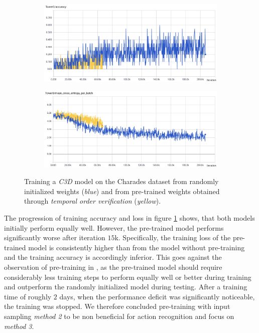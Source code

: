 \begin{figure}[H]
    \begin{subfigure}[c]{\textwidth}
    \centering
    \includegraphics[width=\textwidth]{img_evaluation/pretrain2_initialized/tower0accuracy}
    \end{subfigure}
    \begin{subfigure}[c]{\textwidth}
    \includegraphics[width=\textwidth]{img_evaluation/pretrain2_initialized/tower0crossentropy}
    \end{subfigure}
    \caption{Training a \textit{C3D} model on the Charades dataset from randomly initialized weights (\textit{blue}) and from pre-trained weights obtained through \textit{temporal order verification} (\textit{yellow}).}
    \label{fig:pretrain2_initialized}
\end{figure}

The progression of training accuracy and loss in figure \ref{fig:pretrain2_initialized} shows, that both models initially perform equally well. 
However, the pre-trained model performs significantly worse after iteration $15$k.
Specifically, the training loss of the pre-trained model is consistently higher than from the model without pre-training and the training accuracy is accordingly inferior.
This goes against the observation of pre-training in \cite{misra_shuffle_2016}, as the pre-trained model should require considerably less training steps to perform equally well or better during training and outperform the randomly initialized model during testing.
After a training time of roughly $2$ days, when the performance deficit was significantly noticeable, the training was stopped.
We therefore concluded pre-training with input sampling \textit{method 2} to be non beneficial for action recognition and focus on \textit{method 3}.
\bigskip

